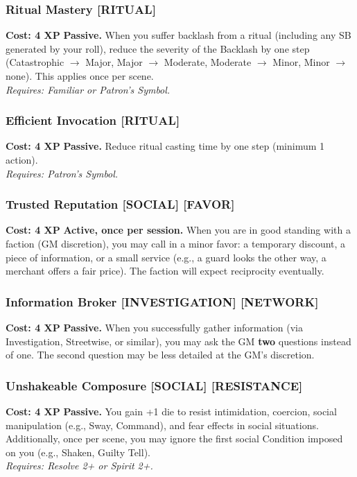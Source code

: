 \documentclass[12pt,a4paper]{book}
\begin{document}
\subsubsection*{Ritual Mastery \textnormal{[RITUAL]}}
\label{talent:ritual-mastery}
\textbf{Cost: 4 XP} \textbf{Passive.} When you suffer backlash from a ritual (including any SB generated by your roll), reduce the severity of the Backlash by one step (Catastrophic $\rightarrow$ Major, Major $\rightarrow$ Moderate, Moderate $\rightarrow$ Minor, Minor $\rightarrow$ none). This applies once per scene. \\
\textit{Requires: Familiar or Patron's Symbol.}

\subsubsection*{Efficient Invocation \textnormal{[RITUAL]}}
\label{talent:efficient-invocation}
\textbf{Cost: 4 XP} \textbf{Passive.} Reduce ritual casting time by one step (minimum 1 action). \\
\textit{Requires: Patron's Symbol.}

\subsubsection*{Trusted Reputation \textnormal{[SOCIAL] [FAVOR]}}
\label{talent:trusted-reputation}
\textbf{Cost: 4 XP} \textbf{Active, once per session.} When you are in good standing with a faction (GM discretion), you may call in a minor favor: a temporary discount, a piece of information, or a small service (e.g., a guard looks the other way, a merchant offers a fair price). The faction will expect reciprocity eventually.

\subsubsection*{Information Broker \textnormal{[INVESTIGATION] [NETWORK]}}
\label{talent:information-broker}
\textbf{Cost: 4 XP} \textbf{Passive.} When you successfully gather information (via Investigation, Streetwise, or similar), you may ask the GM \textbf{two} questions instead of one. The second question may be less detailed at the GM's discretion.

\subsubsection*{Unshakeable Composure \textnormal{[SOCIAL] [RESISTANCE]}}
\label{talent:unshakeable-composure}
\textbf{Cost: 4 XP} \textbf{Passive.} You gain +1 die to resist intimidation, coercion, social manipulation (e.g., Sway, Command), and fear effects in social situations. Additionally, once per scene, you may ignore the first social Condition imposed on you (e.g., Shaken, Guilty Tell). \\
\textit{Requires: Resolve 2+ or Spirit 2+.}
\end{document}

